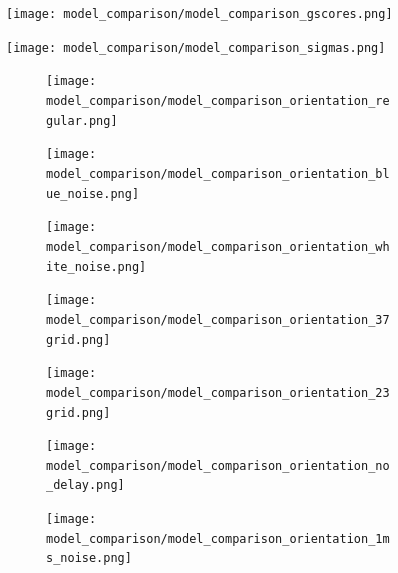 \documentclass{article}
\begin{document}
    \begin{figure}[htbp]
        \centering
        
        \begin{minipage}[b]{1\textwidth}
            \centering
            \subcaption{}
            \texttt{[image: model\_comparison/model\_comparison\_gscores.png]}
        \end{minipage}
        \begin{minipage}[b]{1\textwidth}
            \centering
            \subcaption{}
            \texttt{[image: model\_comparison/model\_comparison\_sigmas.png]} 
        \end{minipage}
        \begin{minipage}[t]{1\textwidth}
            \centering
            \subcaption{}
            \begin{subfigure}{0.08\textwidth}
                \texttt{[image: model\_comparison/model\_comparison\_orientation\_regular.png]}
            \end{subfigure}
            \begin{subfigure}{0.08\textwidth}
                \texttt{[image: model\_comparison/model\_comparison\_orientation\_blue\_noise.png]}
            \end{subfigure}
            \begin{subfigure}{0.08\textwidth}
                \texttt{[image: model\_comparison/model\_comparison\_orientation\_white\_noise.png]}
            \end{subfigure}
            \begin{subfigure}{0.08\textwidth}
                \texttt{[image: model\_comparison/model\_comparison\_orientation\_37grid.png]}
            \end{subfigure}
            \begin{subfigure}{0.08\textwidth}
                \texttt{[image: model\_comparison/model\_comparison\_orientation\_23grid.png]}
            \end{subfigure}
            \begin{subfigure}{0.08\textwidth}
                \texttt{[image: model\_comparison/model\_comparison\_orientation\_no\_delay.png]}
            \end{subfigure}
            \begin{subfigure}{0.08\textwidth}
                \texttt{[image: model\_comparison/model\_comparison\_orientation\_1ms\_noise.png]}
            \end{subfigure}
            \begin{subfigure}{0.08\textwidth}

\end{subfigure}
\end{minipage}
\end{figure}
\end{document}
